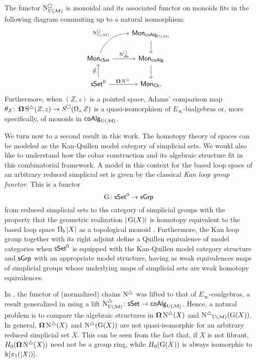 \begin{theorem} \label{t:1st main thm in the intro}
	The functor $\operatorname{N^{\square}_{{\operatorname{U}(\mathcal{M})}}}$ is monoidal and its associated functor on monoids fits in the following diagram commuting up to a natural isomorphism:
	\[
	\begin{tikzcd}
	& \Mon_{\coAlg_\UM} \arrow[d] \\
	\Mon_{\cSet} \arrow[ru, "\cchainsUM", out=70, in=180] \arrow[r, "\cchainsAs"]
	& \Mon_{\coAlg} \arrow[d] \\
	\sSet^0 \arrow[r, "\cobar \schains"] \arrow[u, "\ccobar"]
	& \Mon_{\Ch}.
	\end{tikzcd}
	\]
	Furthermore, when $(Z, z)$ is a pointed space, Adams' comparison map $\theta_Z \colon \operatorname{\mathbf{\Omega}} \operatorname{S^{\triangle}}(Z, z) \to S^{\square}(\operatorname{\Omega}_z Z)$ is a quasi-isomorphism of $E_{\infty}$-bialgebras or, more specifically, of monoids in $\mathsf{coAlg}_{\operatorname{U}(\mathcal{M})}$.
\end{theorem}

We turn now to a second result in this work.
The homotopy theory of spaces can be modeled as the Kan-Quillen model category of simplicial sets.
We would also like to understand how the cobar construction and its algebraic structure fit in this combinatorial framework.
A model in this context for the based loop space of an arbitrary reduced simplicial set is given by the classical \textit{Kan loop group functor}.
This is a functor
\[
\operatorname{G} \colon \mathsf{sSet}^0 \to \mathsf{sGrp}
\]
from reduced simplicial sets to the category of simplicial groups with the property that the geometric realization $|\operatorname{G}(X)|$ is homotopy equivalent to the based loop space $\operatorname{\Omega}_b|X|$ as a topological monoid \cite{berger1995loops}.
Furthermore, the Kan loop group together with its right adjoint define a Quillen equivalence of model categories when $\mathsf{sSet}^0$ is equipped with the Kan-Quillen model category structure and $\mathsf{sGrp}$ with an appropriate model structure, having as weak equivalences maps of simplicial groups whose underlying maps of simplicial sets are weak homotopy equivalences.

In \cite{mcclure2003multivariable, berger2004combinatorial}, the functor of (normalized) chains $\operatorname{N^{\triangle}}$ was lifted to that of $E_{\infty}$-coalgebras, a result generalized in \cite{medina2020prop1} using a lift $\operatorname{N^{\triangle}_{{\operatorname{U}(\mathcal{M})}}} \colon \mathsf{sSet} \to \mathsf{coAlg}_{{\operatorname{U}(\mathcal{M})}}$.
Hence, a natural problem is to compare the algebraic structures in $\operatorname{\mathbf{\Omega}} \operatorname{N^{\triangle}}(X)$ and $\operatorname{N^{\triangle}}_{{\operatorname{U}(\mathcal{M})}}(\operatorname{G}(X))$.
In general, $\operatorname{\mathbf{\Omega}} \operatorname{N^{\triangle}}(X)$ and $\operatorname{N^{\triangle}}(\operatorname{G}(X))$ are not quasi-isomorphic for an arbitrary reduced simplicial set $X$.
This can be seen from the fact that, if $X$ is not fibrant, $H_0(\operatorname{\mathbf{\Omega}} \operatorname{N^{\triangle}}(X))$ need not be a group ring, while $H_0(\operatorname{G}(X))$ is always isomorphic to $ \Bbbk[\pi_1(|X|)]$.

